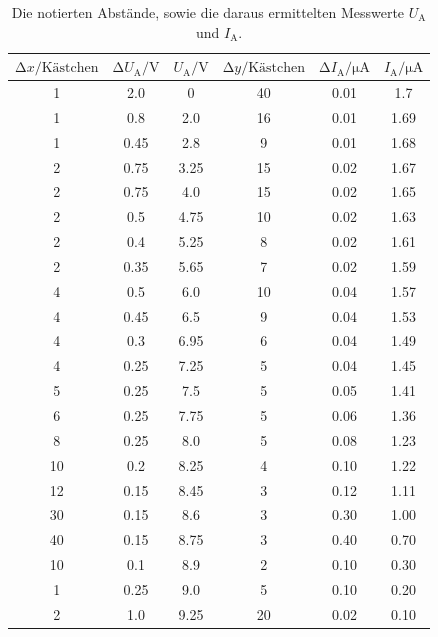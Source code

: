 \begin{table}
    \centering
    \caption{Die notierten Abstände, sowie die daraus ermittelten Messwerte $U_\text{A}$ und $I_\text{A}$.}
    \label{tab:Steigungsdreiecke}
    \begin{tabular}{c c c c c c}
    \toprule
    $\increment x /\text{Kästchen}$ & $\increment U_\text{A} / \si{\volt}$&  $ U_\text{A} / \si{\volt}$ & $\increment y / \text{Kästchen}$ & $\increment I_\text{A} / \si{\micro\ampere}$ & $I_\text{A} / \si{\micro\ampere}$\\
    \midrule
        1  & 2.0  & 0    &  40 & 0.01 & 1.7 \\
        1  & 0.8  & 2.0  &  16 & 0.01 & 1.69\\
        1  & 0.45 & 2.8  &   9 & 0.01 & 1.68\\
        2  & 0.75 & 3.25 &  15 & 0.02 & 1.67\\
        2  & 0.75 & 4.0  &  15 & 0.02 & 1.65\\
        2  & 0.5  & 4.75 &  10 & 0.02 & 1.63\\
        2  & 0.4  & 5.25 &   8 & 0.02 & 1.61\\
        2  & 0.35 & 5.65 &   7 & 0.02 & 1.59\\
        4  & 0.5  & 6.0  &  10 & 0.04 & 1.57\\
        4  & 0.45 & 6.5  &   9 & 0.04 & 1.53\\
        4  & 0.3  & 6.95 &   6 & 0.04 & 1.49\\
        4  & 0.25 & 7.25 &   5 & 0.04 & 1.45\\
        5  & 0.25 & 7.5  &   5 & 0.05 & 1.41\\
        6  & 0.25 & 7.75 &   5 & 0.06 & 1.36\\
        8  & 0.25 & 8.0  &   5 & 0.08 & 1.23\\
        10 & 0.2  & 8.25 &   4 & 0.10 & 1.22\\
        12 & 0.15 & 8.45 &   3 & 0.12 & 1.11\\  
        30 & 0.15 & 8.6  &   3 & 0.30 & 1.00\\
        40 & 0.15 & 8.75 &   3 & 0.40 & 0.70\\
        10 & 0.1  &  8.9 &   2 & 0.10 & 0.30\\ 
        1  & 0.25 & 9.0  &   5 & 0.10 & 0.20\\
        2  & 1.0  & 9.25 &  20 & 0.02 & 0.10\\
    \bottomrule
    \end{tabular}
\end{table}

